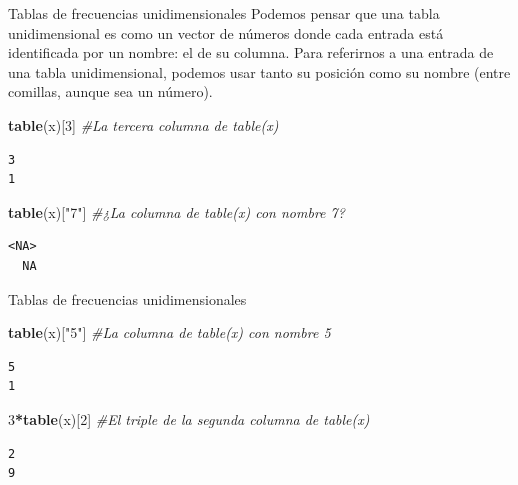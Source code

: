 \documentclass[
  ignorenonframetext,
  aspectratio=169]{beamer}
\newenvironment{Shaded}{\begin{snugshade}}{\end{snugshade}}
\newcommand{\CommentTok}[1]{\textcolor[rgb]{0.56,0.35,0.01}{\textit{#1}}}
\newcommand{\DecValTok}[1]{\textcolor[rgb]{0.00,0.00,0.81}{#1}}
\newcommand{\FunctionTok}[1]{\textcolor[rgb]{0.13,0.29,0.53}{\textbf{#1}}}
\newcommand{\NormalTok}[1]{#1}
\newcommand{\SpecialCharTok}[1]{\textcolor[rgb]{0.81,0.36,0.00}{\textbf{#1}}}
\newcommand{\StringTok}[1]{\textcolor[rgb]{0.31,0.60,0.02}{#1}}
\begin{document}
\begin{frame}[fragile]{Tablas de frecuencias unidimensionales}
\label{tablas-de-frecuencias-unidimensionales-5}
Podemos pensar que una tabla unidimensional es como un vector de números
donde cada entrada está identificada por un nombre: el de su columna.
Para referirnos a una entrada de una tabla unidimensional, podemos usar
tanto su posición como su nombre (entre comillas, aunque sea un número).

\begin{Shaded}
\begin{Highlighting}[]
\FunctionTok{table}\NormalTok{(x)[}\DecValTok{3}\NormalTok{] }\CommentTok{\#La tercera columna de table(x)}
\end{Highlighting}
\end{Shaded}

\begin{verbatim}
3 
1 
\end{verbatim}

\begin{Shaded}
\begin{Highlighting}[]
\FunctionTok{table}\NormalTok{(x)[}\StringTok{"7"}\NormalTok{] }\CommentTok{\#¿La columna de table(x) con nombre 7?}
\end{Highlighting}
\end{Shaded}

\begin{verbatim}
<NA> 
  NA 
\end{verbatim}
\end{frame}

\begin{frame}[fragile]{Tablas de frecuencias unidimensionales}
\label{tablas-de-frecuencias-unidimensionales-6}
\begin{Shaded}
\begin{Highlighting}[]
\FunctionTok{table}\NormalTok{(x)[}\StringTok{"5"}\NormalTok{] }\CommentTok{\#La columna de table(x) con nombre 5}
\end{Highlighting}
\end{Shaded}

\begin{verbatim}
5 
1 
\end{verbatim}

\begin{Shaded}
\begin{Highlighting}[]
\DecValTok{3}\SpecialCharTok{*}\FunctionTok{table}\NormalTok{(x)[}\DecValTok{2}\NormalTok{] }\CommentTok{\#El triple de la segunda columna de table(x)}
\end{Highlighting}
\end{Shaded}

\begin{verbatim}
2 
9 
\end{verbatim}
\end{frame}
\end{document}
